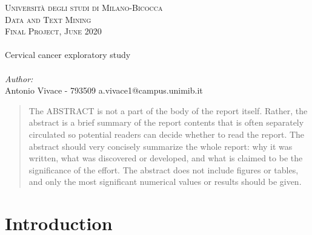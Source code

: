 \begin{center} %
 

\textsc{\small Università degli studi di Milano-Bicocca}\\[1cm] %
\textsc{\Large Data and Text Mining }\\[0.3cm] %
\textsc{Final Project, June 2020}\\[0.1cm] %


\HRule \\[0.6cm]
{ \huge Cervical cancer exploratory study}\\ %
\HRule \\[1.0cm]
 

\large
\emph{Author:}\\
Antonio Vivace - 793509 a.vivace1@campus.unimib.it \\[1cm] %

\end{center}

\begin{abstract}
The ABSTRACT is not a part of the body of the report itself. Rather, the abstract is a brief summary of the report contents that is often separately circulated so potential readers can decide whether to read the report. The abstract should very concisely summarize the whole report: why it was written, what was discovered or developed, and what is claimed to be the significance of the effort. The abstract does not include figures or tables, and only the most significant numerical values or results should be given.
\end{abstract}

\section{Introduction}

